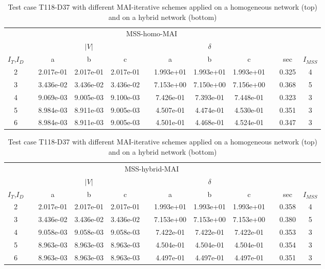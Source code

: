 \begin{table}
\renewcommand{\arraystretch}{1.3}
\centering
\caption{Test case T118-D37 with different MAI-iterative schemes applied on a homogeneous network (top) and on a hybrid network (bottom)}\label{tab:MAIschemes}
\begin{adjustbox}{width=1\textwidth} %
\small
\begin{tabular}{cccccccccccc}
\toprule
{} && \multicolumn{7}{c}{MSS-homo-MAI} && &  \\
\cmidrule{3-9}
{} && \multicolumn{3}{c}{$|V|$} && \multicolumn{3}{c}{$\delta$} && \\
\cmidrule{3-5}\cmidrule{7-9}
{$I_T$,$I_D$} &&        a &        b &       c &&        a &       b &        c && sec & $I_{MSS}$\\
\midrule
2 &&  2.017e-01 &  2.017e-01 &  2.017e-01 &&  1.993e+01 &  1.993e+01 &  1.993e+01 && 0.325 & 4 \\
3 &&  3.436e-02 &  3.436e-02 &  3.436e-02 &&  7.153e+00 &  7.150e+00 &  7.156e+00 && 0.368 & 5 \\
4 &&  9.069e-03 &  9.005e-03 &  9.100e-03 &&  7.426e-01 &  7.393e-01 &  7.448e-01 && 0.323 & 3\\
5 &&  8.984e-03 &  8.911e-03 &  9.005e-03 &&  4.507e-01 &  4.474e-01 &  4.530e-01 && 0.351 & 3\\
6 &&  8.984e-03 &  8.911e-03 &  9.005e-03 &&  4.501e-01 &  4.468e-01 &  4.524e-01 && 0.347 & 3\\
\bottomrule
\end{tabular}
\end{adjustbox}
\begin{adjustbox}{width=1\textwidth} %
\small
\begin{tabular}{cccccccccccc}
\toprule
{} && \multicolumn{7}{c}{MSS-hybrid-MAI} && &  \\
\cmidrule{3-9}
{} && \multicolumn{3}{c}{$|V|$} && \multicolumn{3}{c}{$\delta$} && \\
\cmidrule{3-5}\cmidrule{7-9}
{$I_T$,$I_D$} &&        a &        b &       c &&        a &       b &        c && sec & $I_{MSS}$\\
\midrule
2 &&  2.017e-01 &  2.017e-01 &  2.017e-01 &&  1.993e+01 &  1.993e+01 &  1.993e+01 && 0.358 & 4 \\
3 &&  3.436e-02 &  3.436e-02 &  3.436e-02 &&  7.153e+00 &  7.153e+00 &  7.153e+00 && 0.380& 5\\
4 &&  9.058e-03 &  9.058e-03 &  9.058e-03 &&  7.422e-01 &  7.422e-01 &  7.422e-01 && 0.353& 3\\
5 &&  8.963e-03 &  8.963e-03 &  8.963e-03 &&  4.504e-01 &  4.504e-01 &  4.504e-01 && 0.354& 3 \\
6 &&  8.963e-03 &  8.963e-03 &  8.963e-03 &&  4.497e-01 &  4.497e-01 &  4.497e-01 && 0.351&3\\
\bottomrule
\end{tabular}
\end{adjustbox}

\end{table}
